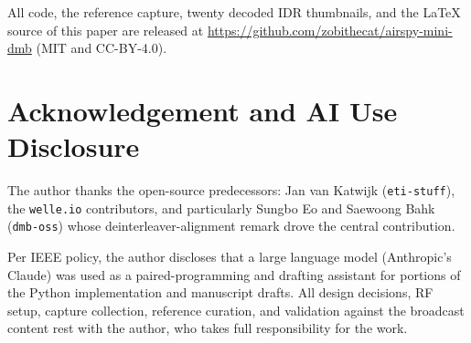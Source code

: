 \documentclass[conference,letterpaper,10pt]{IEEEtran}
\begin{document}
All code, the reference capture, twenty decoded IDR thumbnails,
and the LaTeX source of this paper are released at
\url{https://github.com/zobithecat/airspy-mini-dmb} (MIT and
CC-BY-4.0).

\section*{Acknowledgement and AI Use Disclosure}

The author thanks the open-source predecessors: Jan van Katwijk
(\texttt{eti-stuff}), the \texttt{welle.io} contributors, and
particularly Sungbo Eo and Saewoong Bahk (\texttt{dmb-oss}) whose
deinterleaver-alignment remark drove the central contribution.

Per IEEE policy, the author discloses that a large language model
(Anthropic's Claude) was used as a paired-programming and
drafting assistant for portions of the Python implementation and
manuscript drafts.  All design decisions, RF setup, capture
collection, reference curation, and validation against the
broadcast content rest with the author, who takes full
responsibility for the work.



\end{document}
